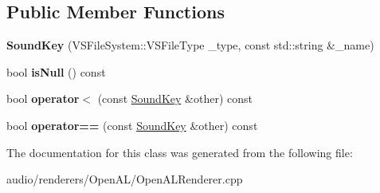 \subsection*{Public Member Functions}
\begin{DoxyCompactItemize}
\item 
{\bfseries Sound\+Key} (V\+S\+File\+System\+::\+V\+S\+File\+Type \+\_\+type, const std\+::string \&\+\_\+name)\hypertarget{classAudio_1_1____impl_1_1OpenAL_1_1RendererData_1_1SoundKey_a9193cf7f13cfafcf481d939f5a35bed1}{}\label{classAudio_1_1____impl_1_1OpenAL_1_1RendererData_1_1SoundKey_a9193cf7f13cfafcf481d939f5a35bed1}

\item 
bool {\bfseries is\+Null} () const \hypertarget{classAudio_1_1____impl_1_1OpenAL_1_1RendererData_1_1SoundKey_a0adbce5cd0e11d8325f42d323be54d46}{}\label{classAudio_1_1____impl_1_1OpenAL_1_1RendererData_1_1SoundKey_a0adbce5cd0e11d8325f42d323be54d46}

\item 
bool {\bfseries operator$<$} (const \hyperlink{classAudio_1_1____impl_1_1OpenAL_1_1RendererData_1_1SoundKey}{Sound\+Key} \&other) const \hypertarget{classAudio_1_1____impl_1_1OpenAL_1_1RendererData_1_1SoundKey_a852ba1e7c85675ca2c70e02421a54e1d}{}\label{classAudio_1_1____impl_1_1OpenAL_1_1RendererData_1_1SoundKey_a852ba1e7c85675ca2c70e02421a54e1d}

\item 
bool {\bfseries operator==} (const \hyperlink{classAudio_1_1____impl_1_1OpenAL_1_1RendererData_1_1SoundKey}{Sound\+Key} \&other) const \hypertarget{classAudio_1_1____impl_1_1OpenAL_1_1RendererData_1_1SoundKey_a987557ee85825f48f5f458d742790cae}{}\label{classAudio_1_1____impl_1_1OpenAL_1_1RendererData_1_1SoundKey_a987557ee85825f48f5f458d742790cae}

\end{DoxyCompactItemize}


The documentation for this class was generated from the following file\+:\begin{DoxyCompactItemize}
\item 
audio/renderers/\+Open\+A\+L/Open\+A\+L\+Renderer.\+cpp\end{DoxyCompactItemize}
